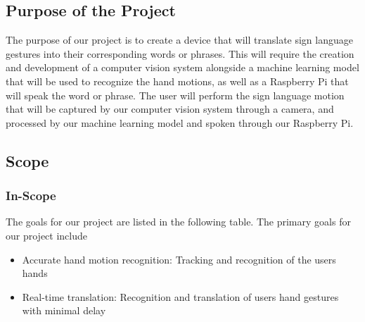 \documentclass[12pt]{article}
\begin{document}
\subsection{Purpose of the Project}
The purpose of our project is to create a device that will translate sign language gestures into their corresponding words or phrases. This will require
the creation and development of a computer vision system alongside a machine learning model that will be used to recognize the hand motions, as well as a 
Raspberry Pi that will speak the word or phrase. The user will perform the sign language motion that will be captured by our computer vision system through
a camera, and processed by our machine learning model and spoken through our Raspberry Pi.\\

\subsection{Scope} 
\subsubsection{In-Scope} \label{sec_inScope}
\indent The goals for our project are listed in the following table. The primary goals for our project include
\begin{itemize}
    \item Accurate hand motion recognition: Tracking and recognition of the user\textquotesingle s hands
    \item Real-time translation: Recognition and translation of user\textquotesingle s hand gestures with minimal delay
\end{itemize}
\end{document}

